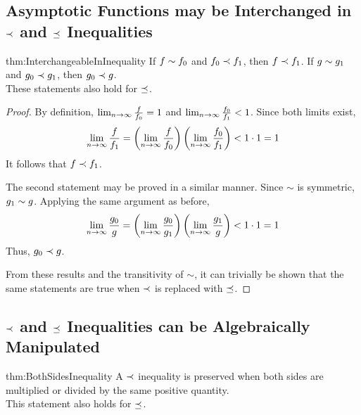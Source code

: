 \subsection{Asymptotic Functions may be Interchanged in $\prec$ and $\preceq$ Inequalities}

\begin{reptheorem}{thm:InterchangeableInInequality}
	If $f \sim f_0$ and $f_0 \prec f_1$, then $f \prec f_1$. If $g \sim g_1$ and $g_0 \prec g_1$, then $g_0 \prec g$.\\
	These statements also hold for $\preceq$.
\end{reptheorem}

\begin{proof}
	By definition, $\lim_{n \to \infty} \frac{f}{f_0} = 1$ and $\lim_{n \to \infty} \frac{f_0}{f_1} < 1$. Since both limits exist,
	\begin{align*}
	\lim_{n \to \infty} \frac{f}{f_1} = \left( \lim_{n \to \infty} \frac{f}{f_0} \right) \left( \lim_{n \to \infty} \frac{f_0}{f_1} \right) < 1 \cdot 1 = 1
	\end{align*}
	It follows that $f \prec f_1$.
	
	The second statement may be proved in a similar manner. Since $\sim$ is symmetric, $g_1 \sim g$. Applying the same argument as before,
	\begin{align*}
	\lim_{n \to \infty} \frac{g_0}{g} = \left( \lim_{n \to \infty} \frac{g_0}{g_1} \right) \left( \lim_{n \to \infty} \frac{g_1}{g} \right) < 1 \cdot 1 = 1
	\end{align*}
	Thus, $g_0 \prec g$.
	
	From these results and the transitivity of $\sim$, it can trivially be shown that the same statements are true when $\prec$ is replaced with $\preceq$.
\end{proof}

\subsection{$\prec$ and $\preceq$ Inequalities can be Algebraically Manipulated}

\begin{reptheorem}{thm:BothSidesInequality}
	A $\prec$ inequality is preserved when both sides are multiplied or divided by the same positive quantity.\\
	This statement also holds for $\preceq$.
\end{reptheorem}

